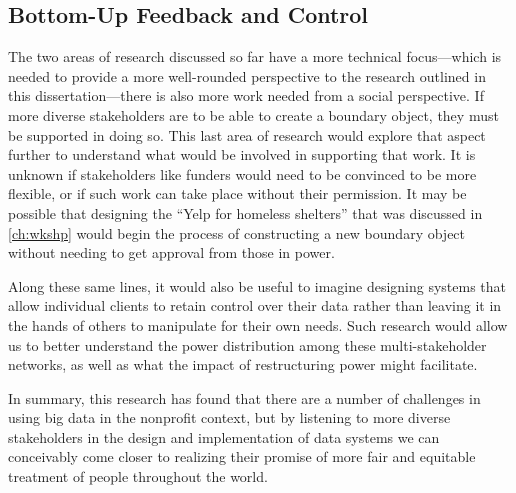 \subsection{Bottom-Up Feedback and Control}
The two areas of research discussed so far have a more technical focus---which is needed to provide a more well-rounded perspective to the research outlined in this dissertation---there is also more work needed from a social perspective. If more diverse stakeholders are to be able to create a boundary object, they must be supported in doing so. This last area of research would explore that aspect further to understand what would be involved in supporting that work. It is unknown if stakeholders like funders would need to be convinced to be more flexible, or if such work can take place without their permission. It may be possible that designing the ``Yelp for homeless shelters'' that was discussed in \autoref{ch:wkshp} would begin the process of constructing a new boundary object without needing to get approval from those in power.

Along these same lines, it would also be useful to imagine designing systems that allow individual clients to retain control over their data rather than leaving it in the hands of others to manipulate for their own needs. Such research would allow us to better understand the power distribution among these multi-stakeholder networks, as well as what the impact of restructuring power might facilitate.

In summary, this research has found that there are a number of challenges in using big data in the nonprofit context, but by listening to more diverse stakeholders in the design and implementation of data systems we can conceivably come closer to realizing their promise of more fair and equitable treatment of people throughout the world.